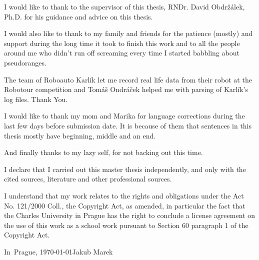 

\noindent
I would like to thank to the supervisor of this thesis,
RNDr. David Obdržálek, Ph.D. for his guidance and advice on this thesis.

I would also like to thank to my family and friends for the patience (mostly) and
support during the long time it took to finish this work and to all the people
around me who didn't run off screaming every time I started babbling about pseudoranges.

The team of Roboauto Karlík let me record real life data from their robot at the
Robotour competition and Tomáš Ondráček helped me with parsing of Karlík's log files.
Thank You.

I would like to thank my mom and Marika for language
corrections during the last few days before submission date.
It is because of them that sentences in this thesis mostly have beginning,
middle and an end.

And finally thanks to my lazy self, for not backing out this time.

\cleartorecto

\vspace*{\fill}
\noindent
I declare that I carried out this master thesis independently, and only with the cited
sources, literature and other professional sources.

I understand that my work relates to the rights and obligations under the Act No.
121/2000 Coll., the Copyright Act, as amended, in particular the fact that the Charles
University in Prague has the right to conclude a license agreement on the use of this
work as a school work pursuant to Section 60 paragraph 1 of the Copyright Act.

\vspace{10mm}
\noindent In~Prague, \today\hspace{\fill}Jakub Marek\\
\vspace{10mm}
\cleartorecto

\tableofcontents*
\cleartorecto

